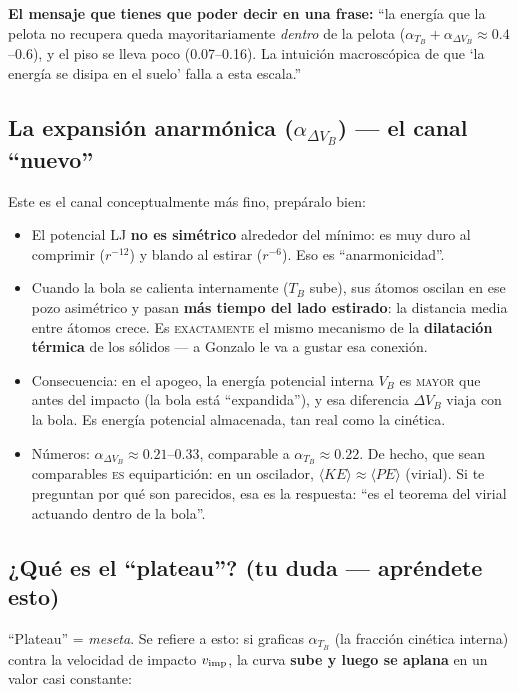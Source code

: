 \documentclass[11pt,a4paper]{article}
\begin{document}
\textbf{El mensaje que tienes que poder decir en una frase:} ``la energía
que la pelota no recupera queda mayoritariamente \emph{dentro} de la
pelota ($\alpha_{T_B}+\alpha_{\Delta V_B}\approx0.4$--$0.6$), y el piso se
lleva poco (0.07--0.16). La intuición macroscópica de que `la energía se
disipa en el suelo' falla a esta escala.''

\subsection{La expansión anarmónica (\texorpdfstring{$\alpha_{\Delta V_B}$}{α\_ΔVB}) --- el canal ``nuevo''}
\label{sec:anarm}

Este es el canal conceptualmente más fino, prepáralo bien:

\begin{itemize}[leftmargin=1.4em]
    \item El potencial LJ \textbf{no es simétrico} alrededor del mínimo:
    es muy duro al comprimir ($r^{-12}$) y blando al estirar ($r^{-6}$).
    Eso es ``anarmonicidad''.
    \item Cuando la bola se calienta internamente ($T_B$ sube), sus
    átomos oscilan en ese pozo asimétrico y pasan \textbf{más tiempo del
    lado estirado}: la distancia media entre átomos crece. Es
    \textsc{exactamente} el mismo mecanismo de la \textbf{dilatación
    térmica} de los sólidos --- a Gonzalo le va a gustar esa conexión.
    \item Consecuencia: en el apogeo, la energía potencial interna $V_B$
    es \textsc{mayor} que antes del impacto (la bola está ``expandida''),
    y esa diferencia $\Delta V_B$ viaja con la bola. Es energía potencial
    almacenada, tan real como la cinética.
    \item Números: $\alpha_{\Delta V_B}\approx0.21$--$0.33$, comparable a
    $\alpha_{T_B}\approx0.22$. De hecho, que sean comparables \textsc{es}
    equipartición: en un oscilador, $\langle KE\rangle\approx\langle
    PE\rangle$ (virial). Si te preguntan por qué son parecidos, esa es
    la respuesta: ``es el teorema del virial actuando dentro de la
    bola''.
\end{itemize}

\subsection{¿Qué es el ``plateau''? (tu duda --- apréndete esto)}
\label{sec:plateau}

``Plateau'' = \emph{meseta}. Se refiere a esto: si graficas
$\alpha_{T_B}$ (la fracción cinética interna) contra la velocidad de
impacto $v_{\rm imp}$, la curva \textbf{sube y luego se aplana} en un
valor casi constante:
\end{document}
